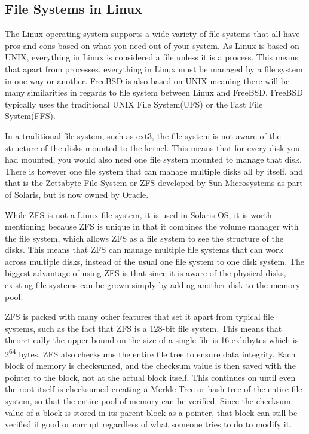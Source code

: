 \documentclass[10pt,serif,draftclsnofoot,onecolumn]{IEEEtran}
\begin{document}
	\subsection{File Systems in Linux}
	\par
	The Linux operating system supports a wide variety of file systems that all have pros and cons based on what you need out of your system. As Linux is based on UNIX, everything in Linux is considered a file unless it is a process. This means that apart from processes, everything in Linux must be managed by a file system in one way or another. FreeBSD is also based on UNIX meaning there will be many similarities in regards to file system between Linux and FreeBSD. FreeBSD typically uses the traditional UNIX File System(UFS) or the Fast File System(FFS)\cite{18}.
	\newline
	\par
	In a traditional file system, such as ext3, the file system is not aware of the structure of the disks mounted to the kernel. This means that for every disk you had mounted, you would also need one file system mounted to manage that disk. There is however one file system that can manage multiple disks all by itself, and that is the Zettabyte File System or ZFS developed by Sun Microsystems as part of Solaris, but is now owned by Oracle.\newline
	\par
	While ZFS is not a Linux file system, it is used in Solaris OS, it is worth mentioning because ZFS is unique in that it combines the volume manager with the file system, which allows ZFS as a file system to see the structure of the disks\cite{17}. This means that ZFS can manage multiple file systems that can work across multiple disks, instead of the usual one file system to one disk system. The biggest advantage of using ZFS is that since it is aware of the physical disks, existing file systems can be grown simply by adding another disk to the memory pool\cite{17}.
	\newline
	\par
	ZFS is packed with many other features that set it apart from typical file systems, such as the fact that ZFS is a 128-bit file system. This means that theoretically the upper bound on the size of a single file is 16 exbibytes which is 2\textsuperscript{64} bytes\cite{17}. ZFS also checksums the entire file tree to ensure data integrity. Each block of memory is checksumed, and the checksum value is then saved with the pointer to the block, not at the actual block itself. This continues on until even the root itself is checksumed creating a Merkle Tree or hash tree of the entire file system, so that the entire pool of memory can be verified. Since the checksum value of a block is stored in its parent block as a pointer, that block can still be verified if good or corrupt regardless of what someone tries to do to modify it\cite{17}.
	\newline
\end{document}
